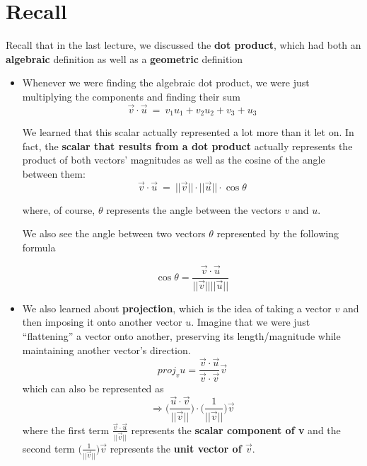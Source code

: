 \documentclass{report}
\begin{document}
\begin{sloppypar}
\begin{enumerate}
\end{enumerate}

\section{Recall}
Recall that in the last lecture, we discussed the
\textbf{dot product}, which had both an \textbf{algebraic}
definition as well as a \textbf{geometric} definition
\begin{itemize}
  \item Whenever we were finding the algebraic
        dot product, we were just multiplying the components
        and finding their sum
        \[ \vec{v} \cdot \vec{u} ~ = ~
        v_{1}u_{1} + v_{2}u_{2} + v_{3}+u_{3} \]

        We learned that this scalar actually represented
        a lot more than it let on. In fact, the
        \textbf{scalar that results from a dot product}
        actually represents the product of both vectors'
        magnitudes as well as the cosine of the angle
        between them:
        \[ \vec{v} \cdot \vec{u} ~ = ~
        || \vec{v} || \cdot || \vec{u} || \cdot
        \cos{\theta} \]

        where, of course, $ \theta $ represents the angle
        between the vectors $ v $ and $ u $.
        \\
        \par We also see the angle between two vectors
        $ \theta $ represented by the following formula

        \[ \cos{\theta} =
        \frac{\vec{v} \cdot \vec{u}}{||\vec{v}|| ||\vec{u}||}
        \]

  \item We also learned about \textbf{projection},
        which is the idea of taking a vector $ v $ and
        then imposing it onto another vector $ u $.
        Imagine that we were just ``flattening'' a vector
        onto another, preserving its length/magnitude
        while maintaining another vector's direction.
        \[ proj_{v}u =
        \frac{\vec{v} \cdot \vec{u}}{\vec{v} \cdot \vec{v}} \vec{v} \]
        which can also be represented as
        \[ \Rightarrow \Biggr(
        \frac{\vec{u} \cdot \vec{v}}{||\vec{v}||}
        \Biggr)
        \cdot
        \Biggr(
        \frac{1}{||\vec{v}||}
        \Biggr) \vec{v}
        \]
        where the first term $ \frac{\vec{v} \cdot \vec{u}}{||\vec{v}||}$ represents the
        \textbf{scalar component of v} and the second
        term $ \Biggr( \frac{1}{||\vec{v}||}\Biggr) \vec{v} $
        represents the \textbf{unit vector of $ \vec{v} $}.



\end{itemize}
\end{sloppypar}
\end{document}
